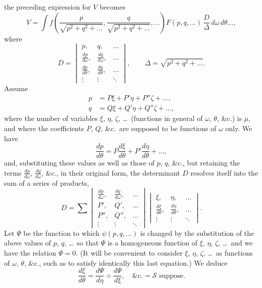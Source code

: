 \documentclass[11pt,a4paper]{article}
\theoremstyle{definition}
\begin{document}
the preceding expression for $V$ becomes
\[
V = \int f\left(\frac{p}{\sqrt{p^{2} + q^{2} + \ldots}}, \frac{q}{\sqrt{p^{2} + q^{2} + \ldots}}, \ldots\right) F(p, q, \ldots)\, \frac{D}{\Delta}\, d\omega\, d\theta\ldots,
\]
where
\[
D = \begin{vmatrix}
p, & q, & \ldots \\
\frac{dp}{d\omega}, & \frac{dq}{d\omega}, & \ldots \\
\frac{dp}{d\theta}, & \frac{dq}{d\theta}, & \ldots \\
\vdots & \vdots & \ddots
\end{vmatrix}, \qquad
\Delta = \sqrt{p^{2} + q^{2} + \ldots}.
\]
Assume
\begin{align*}
p &= P\xi + P'\eta + P''\zeta + \ldots, \\
q &= Q\xi + Q'\eta + Q''\zeta + \ldots,
\end{align*}
where the number of variables $\xi$, $\eta$, $\zeta$, \ldots\ (functions in general of $\omega$, $\theta$, \&c.) is $\mu$, and where the coefficients $P$, $Q$, \&c.\ are supposed to be functions of $\omega$ only. We have
\[
\frac{dp}{d\theta} = P\frac{d\xi}{d\theta} + P'\frac{d\eta}{d\theta} + \ldots,
\]
and, substituting these values as well as those of $p$, $q$, \&c., but retaining the terms $\frac{dp}{d\omega}$, $\frac{dq}{d\omega}$, \&c., in their original form, the determinant $D$ resolves itself into the sum of a series of products,
\[
D = \sum \begin{vmatrix}
\frac{dp}{d\omega}, & \frac{dq}{d\omega}, & \ldots \\
P', & Q', & \ldots \\
P'', & Q'', & \ldots \\
\vdots & \vdots & \ddots
\end{vmatrix}
\begin{vmatrix}
\xi, & \eta, & \ldots \\
\frac{d\xi}{d\theta}, & \frac{d\eta}{d\theta}, & \ldots \\
\vdots & \vdots & \ddots
\end{vmatrix}.
\]
Let $\Psi$ be the function to which $\psi(p, q, \ldots)$ is changed by the substitution of the above values of $p$, $q$, \ldots\ so that $\Psi$ is a homogeneous function of $\xi$, $\eta$, $\zeta$, \ldots\ and we have the relation $\Psi = 0$. (It will be convenient to consider $\xi$, $\eta$, $\zeta$, \ldots\ as functions of $\omega$, $\theta$, \&c., such as to satisfy identically this last equation.) We deduce
\[
\frac{d\xi}{d\theta} = \frac{d\Psi}{d\eta} \div \frac{d\Psi}{d\xi}, \quad \&\text{c.} = \mathcal{S} \text{ suppose}.
\]
\end{document}
